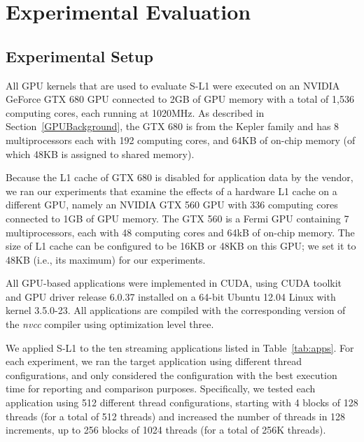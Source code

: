 \section{Experimental Evaluation}\label{sec:results}

\subsection{Experimental Setup}
\label{sec:expSetup}

All GPU kernels that are used to evaluate S-L1 were executed on an NVIDIA GeForce GTX 680 GPU connected to 2GB of GPU memory with a total of 1,536 computing cores, each running at 1020MHz.
As described in Section~\ref{GPUBackground}, the GTX 680 is from the Kepler family and has 8 multiprocessors each with 192 computing cores,  and 64KB of on-chip memory (of which 48KB is assigned to shared memory).

Because the L1 cache of GTX 680 is disabled for application data by the vendor, we ran our experiments that examine the effects of a hardware L1 cache on a different GPU, namely an NVIDIA GTX 560 GPU with 336 computing cores connected to 1GB of GPU memory. 
The GTX 560 is a Fermi GPU containing 7 multiprocessors, each with 48 computing cores and
64kB of on-chip memory. 
The size of L1 cache can be configured to be 16KB or 48KB on this GPU;
we set it to 48KB (i.e., its maximum) for our experiments.

All GPU-based applications were implemented in CUDA, using CUDA toolkit and GPU driver release 6.0.37 installed on a 64-bit Ubuntu 12.04 Linux with kernel 3.5.0-23. 
All applications are compiled with the corresponding version of the {\it nvcc} compiler using optimization level three.

We applied S-L1 to the ten streaming applications listed in Table~\ref{tab:apps}. 
For each experiment, we ran the target application using different thread configurations,
and only considered the configuration with the best execution time for reporting and comparison purposes.
Specifically, we tested each application using 512 different thread configurations,
starting with 4 blocks of 128 threads (for a total of 512 threads) and increased the number of threads in 128 increments, up to 256 blocks of 1024 threads (for a total of 256K threads).

